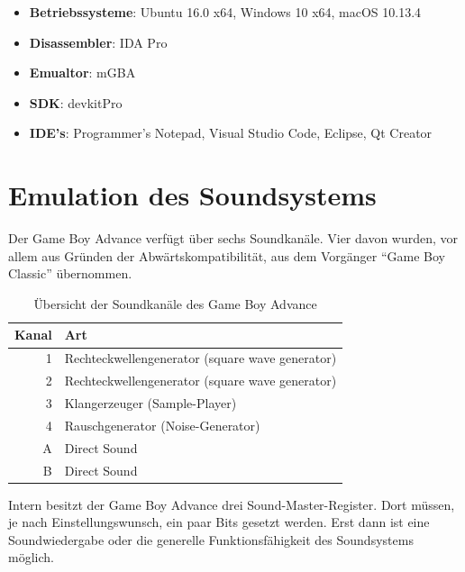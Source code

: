\documentclass[11pt,a4paper]{scrartcl}
\begin{document}
\begin{itemize}
    \item \textbf{Betriebssysteme}: Ubuntu 16.0 x64, Windows 10 x64, macOS 10.13.4
    \item \textbf{Disassembler}: IDA Pro
    \item \textbf{Emualtor}: mGBA
    \item \textbf{SDK}: devkitPro
    \item \textbf{IDE's}: Programmer's Notepad, Visual Studio Code, Eclipse, Qt Creator
\end{itemize}



\section{Emulation des Soundsystems}

Der Game Boy Advance verf\"ugt \"uber sechs Soundkan\"ale. Vier davon wurden, vor allem aus Gr\"unden der Abw\"artskompatibilit\"at, aus dem Vorg\"anger \enquote{Game Boy Classic} \"ubernommen.

\begin{table}[h]
    \centering
    \begin{tabular}{ r | p{10cm} }
        \textbf{Kanal} & \textbf{Art} \\
        \hline
        1 & Rechteckwellengenerator (square wave generator) \\
        \hline
        2 & Rechteckwellengenerator (square wave generator) \\
        \hline
        3 & Klangerzeuger (Sample-Player) \\
        \hline
        4 & Rauschgenerator (Noise-Generator) \\
        \hline
        A & Direct Sound \\
        \hline
        B & Direct Sound \\
    \end{tabular}
    \caption{\"Ubersicht der Soundkan\"ale des Game Boy Advance}
    \label{table:TechnischeDaten}
\end{table}

Intern besitzt der Game Boy Advance drei Sound-Master-Register. Dort m\"ussen, je nach Einstellungswunsch, ein paar Bits gesetzt werden. Erst dann ist eine Soundwiedergabe oder die generelle Funktionsf\"ahigkeit des Soundsystems m\"oglich.\cite{GameBoySoundsystem}

\end{document}
